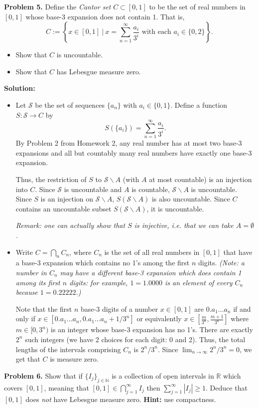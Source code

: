 \documentclass[12pt]{article}
\def\black{\color{black}}
\def\green{\color{rltgreen}}
\newcommand\bi{\begin{itemize}}
\newcommand\ei{\end{itemize}}
\newcommand\itemi{\item[(i)]}
\newcommand\itemii{\item[(ii)]}
\renewcommand\|{\ | \ }
\newcommand\ra{\rightarrow}
\newcommand\mc\mathcal
\newcommand\N{\mathbb{N}}
\newcommand\R{\mathbb{R}}
\def\pb#1{{\green \bf Problem #1.}\hskip 8pt \black}
\def\sol{\textbf{Solution:}}
\def\sequence#1{$\{{#1}_n\}$}
\def\sumint#1{\sum_{#1=1}^\infty}
\newcommand\limn{\lim_{n \ra \infty}}
\begin{document}
\pb{5}
Define the \emph{Cantor set} $C \subset [0, 1]$ to be the set of real numbers
in $[0, 1]$ whose base-3 expansion does not contain 1. That is,
\[
C:= \left\{
	x \in [0, 1] \| x = \sumint n \frac{a_i}{3^i}
    \text{ with each } a_i \in \{0, 2\}
\right\}.
\]
\bi
\itemi
Show that $C$ is uncountable.
\itemii
Show that $C$ has Lebesgue measure zero.
\ei

\sol

\bi
\itemi
Let $\mc S$ be the set of sequences \sequence a with $a_i \in \{0, 1\}$. 
Define a function $S: \mc S \ra C$ by
\[
S(\{a_i\}) = \sumint n \frac{a_i}{3^i}.
\]
By Problem 2 from Homework 2,
any real number has at most two base-3 expansions and all but countably
many real numbers have exactly one base-3 expansion. 

Thus, the restriction of $S$ to $\mc S \backslash A$ (with $A$ at 
most countable) is an injection into $C$. Since $\mc S$ is uncountable
and $A$ is countable, $\mc S \backslash A$ is uncountable. Since
$S$ is an injection on $\mc S \backslash A$, $S(\mc S \backslash A)$ is
also uncountable. Since $C$ contains an uncountable subset 
$S(\mc S \backslash A)$, it is uncountable.

\emph{Remark: one can actually show that $S$ is injective, i.e. that
we can take $A = \emptyset$.}
\itemii
Write $C = \bigcap_n C_n$, where $C_n$ is the set of all real numbers in
$[0, 1]$ that have a base-3 expansion which contains no 1's among the 
first $n$ digits.
\emph{
(Note: a number in $C_n$ may have a different base-3 expansion which does 
contain 1 among its first $n$ digits: for example, $1 = 1.0000$ is 
an element of every $C_n$ because $1 = 0.22222$.)}

Note that the first $n$ base-3 digits of a number $x \in [0, 1]$ are
$0.a_1\ldots a_n$ if and only if 
$x \in [0.a_1\ldots a_n, 0.a_1\ldots a_n + 1 / 3^n]$ or equivalently
$x \in [\frac m {3^n}, \frac {m + 1}{3^n}]$ where $m \in [0, 3^n)$ is an 
integer whose base-3 expansion has no 1's. There are exactly $2^n$ such
integers (we have 2 choices for each digit: 0 and 2). Thus, the total
lengths of the intervals comprising $C_n$ is $2^n / 3^n$. Since 
$\limn 2^n / 3^n = 0$, we get that $C$ is measure zero.
\ei



\pb{6}
Show that if $\{I_j\}_{j \in \N}$ is a collection of open intervals in $\R$
which covers $[0, 1]$, meaning that $[0, 1] \in \bigcap_{j = 1}^\infty I_j$
then $\sumint j |I_j| \geq 1$. Deduce that $[0, 1]$ does \emph{not} have
Lebesgue measure zero. \textbf{Hint:} use compactness.
\end{document}
